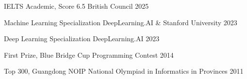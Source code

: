
\begin{cvhonors}

  \cvhonor
    {IELTS Academic, Score 6.5} %
    {British Council} %
    {} %
    {2025} %

  \cvhonor
    {Machine Learning Specialization} %
    {DeepLearning.AI \& Stanford University} %
    {} %
    {2023} %

  \cvhonor
    {Deep Learning Specialization} %
    {DeepLearning.AI} %
    {} %
    {2023} %

  \cvhonor
    {First Prize, Blue Bridge Cup Programming Contest} %
    {} %
    {} %
    {2014} %

  \cvhonor
    {Top 300, Guangdong NOIP} %
    {National Olympiad in Informatics in Provinces} %
    {} %
    {2011} %

\end{cvhonors}
